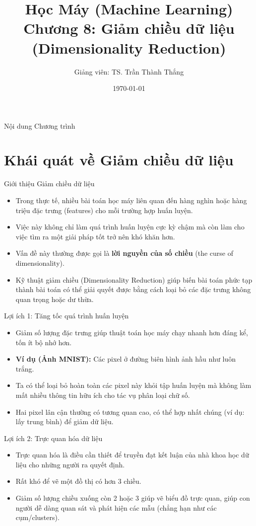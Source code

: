 \documentclass[aspectratio=169]{beamer}
\title[Chương 8: Giảm chiều dữ liệu]{Học Máy (Machine Learning)\\Chương 8: Giảm chiều dữ liệu (Dimensionality Reduction)}
\author{Giảng viên: TS. Trần Thành Thắng}
\institute{Đại học Đông Á}
\date{\today}
\begin{document}
\begin{frame}
    \titlepage
\end{frame}

\begin{frame}{Nội dung Chương trình}
    \tableofcontents
\end{frame}

\section{Khái quát về Giảm chiều dữ liệu}
\begin{frame}{Giới thiệu Giảm chiều dữ liệu}
    \begin{itemize}
        \item Trong thực tế, nhiều bài toán học máy liên quan đến hàng nghìn hoặc hàng triệu đặc trưng (features) cho mỗi trường hợp huấn luyện.
        \item Việc này không chỉ làm quá trình huấn luyện cực kỳ chậm mà còn làm cho việc tìm ra một giải pháp tốt trở nên khó khăn hơn.
        \item Vấn đề này thường được gọi là \textbf{lời nguyền của số chiều} (the curse of dimensionality).
        \item Kỹ thuật giảm chiều (Dimensionality Reduction) giúp biến bài toán phức tạp thành bài toán có thể giải quyết được bằng cách loại bỏ các đặc trưng không quan trọng hoặc dư thừa.
    \end{itemize}
\end{frame}

\begin{frame}{Lợi ích 1: Tăng tốc quá trình huấn luyện}
    \begin{itemize}
        \item Giảm số lượng đặc trưng giúp thuật toán học máy chạy nhanh hơn đáng kể, tốn ít bộ nhớ hơn.
        \item \textbf{Ví dụ (Ảnh MNIST):} Các pixel ở đường biên hình ảnh hầu như luôn trắng.
        \item Ta có thể loại bỏ hoàn toàn các pixel này khỏi tập huấn luyện mà không làm mất nhiều thông tin hữu ích cho tác vụ phân loại chữ số.
        \item Hai pixel lân cận thường có tương quan cao, có thể hợp nhất chúng (ví dụ: lấy trung bình) để giảm dữ liệu.
    \end{itemize}
\end{frame}

\begin{frame}{Lợi ích 2: Trực quan hóa dữ liệu}
    \begin{itemize}
        \item Trực quan hóa là điều cần thiết để truyền đạt kết luận của nhà khoa học dữ liệu cho những người ra quyết định.
        \item Rất khó để vẽ một đồ thị có hơn 3 chiều.
        \item Giảm số lượng chiều xuống còn 2 hoặc 3 giúp vẽ biểu đồ trực quan, giúp con người dễ dàng quan sát và phát hiện các mẫu (chẳng hạn như các cụm/clusters).
    \end{itemize}
\end{frame}
\end{document}
